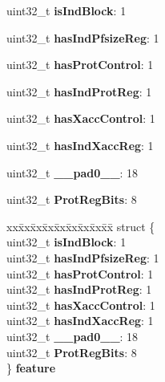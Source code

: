 \begin{DoxyCompactItemize}
\begin{tabbing}
\end{tabbing}\item 
uint32\+\_\+t {\bfseries is\+Ind\+Block}\+: 1
\item 
uint32\+\_\+t {\bfseries has\+Ind\+Pfsize\+Reg}\+: 1
\item 
uint32\+\_\+t {\bfseries has\+Prot\+Control}\+: 1
\item 
uint32\+\_\+t {\bfseries has\+Ind\+Prot\+Reg}\+: 1
\item 
uint32\+\_\+t {\bfseries has\+Xacc\+Control}\+: 1
\item 
uint32\+\_\+t {\bfseries has\+Ind\+Xacc\+Reg}\+: 1
\item 
uint32\+\_\+t {\bfseries \+\_\+\+\_\+pad0\+\_\+\+\_\+}\+: 18
\item 
uint32\+\_\+t {\bfseries Prot\+Reg\+Bits}\+: 8
\item 
\mbox{\label{group__ftfx__controller_ga6a51876ea07035e5f4c10a3003bfdcb1}} 
\begin{tabbing}
xx\=xx\=xx\=xx\=xx\=xx\=xx\=xx\=xx\=\kill
struct \{\\
\>uint32\_t {\bfseries isIndBlock}: 1\\
\>uint32\_t {\bfseries hasIndPfsizeReg}: 1\\
\>uint32\_t {\bfseries hasProtControl}: 1\\
\>uint32\_t {\bfseries hasIndProtReg}: 1\\
\>uint32\_t {\bfseries hasXaccControl}: 1\\
\>uint32\_t {\bfseries hasIndXaccReg}: 1\\
\>uint32\_t {\bfseries \_\_pad0\_\_}: 18\\
\>uint32\_t {\bfseries ProtRegBits}: 8\\
\} {\bfseries feature}\\


\end{tabbing}
\end{DoxyCompactItemize}
